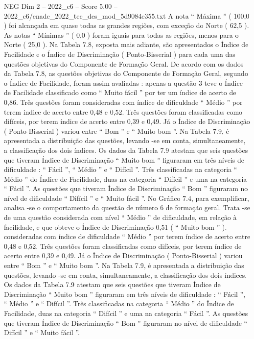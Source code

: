 \begin{textsample}{NEG Dim 2 – 2022\_c6 – Score 5.00 – 2022\_c6/enade\_2022\_tec\_des\_mod\_5d9084e355.txt}
A nota “ Máxima ” ( 100,0 ) foi alcançada em quase todas as grandes regiões, com exceção do Norte ( 62,5 ).
As notas “ Mínimas ” ( 0,0 ) foram iguais para todas as regiões, menos para o Norte ( 25,0 ).
Na Tabela 7.8, exposta mais adiante, são apresentados o Índice de Facilidade e o Índice de Discriminação ( Ponto-Bisserial ) para cada uma das questões objetivas do Componente de Formação Geral.
De acordo com os dados da Tabela 7.8, as questões objetivas do Componente de Formação Geral, segundo o Índice de Facilidade, foram assim avaliadas : apenas a questão 3 teve o Índice de Facilidade classificado como “ Muito fácil ” por ter um índice de acerto de 0,86.
Três questões foram consideradas com índice de dificuldade “ Médio ” por terem índice de acerto entre 0,48 e 0,52.
Três questões foram classificadas como difíceis, por terem índice de acerto entre 0,39 e 0,49.
Já o Índice de Discriminação ( Ponto-Bisserial ) variou entre “ Bom ” e “ Muito bom ”.
Na Tabela 7.9, é apresentada a distribuição das questões, levando -se em conta, simultaneamente, a classificação dos dois índices.
Os dados da Tabela 7.9 atestam que seis questões que tiveram Índice de Discriminação “ Muito bom ” figuraram em três níveis de dificuldade : “ Fácil ”, “ Médio ” e “ Difícil ”.
Três classificadas na categoria “ Médio ” do Índice de Facilidade, duas na categoria “ Difícil ” e uma na categoria “ Fácil ”.
As questões que tiveram Índice de Discriminação “ Bom ” figuraram no nível de dificuldade “ Difícil ” e “ Muito fácil ”.
No Gráfico 7.4, para exemplificar, analisa -se o comportamento da questão de número 6 de formação geral.
Trata -se de uma questão considerada com nível “ Médio ” de dificuldade, em relação à facilidade, e que obteve o Índice de Discriminação 0,51 ( “ Muito bom ” ). consideradas com índice de dificuldade “ Médio ” por terem índice de acerto entre 0,48 e 0,52.
Três questões foram classificadas como difíceis, por terem índice de acerto entre 0,39 e 0,49.
Já o Índice de Discriminação ( Ponto-Bisserial ) variou entre “ Bom ” e “ Muito bom ”.
Na Tabela 7.9, é apresentada a distribuição das questões, levando -se em conta, simultaneamente, a classificação dos dois índices.
Os dados da Tabela 7.9 atestam que seis questões que tiveram Índice de Discriminação “ Muito bom ” figuraram em três níveis de dificuldade : “ Fácil ”, “ Médio ” e “ Difícil ”.
Três classificadas na categoria “ Médio ” do Índice de Facilidade, duas na categoria “ Difícil ” e uma na categoria “ Fácil ”.
As questões que tiveram Índice de Discriminação “ Bom ” figuraram no nível de dificuldade “ Difícil ” e “ Muito fácil ”.

\end{textsample}
